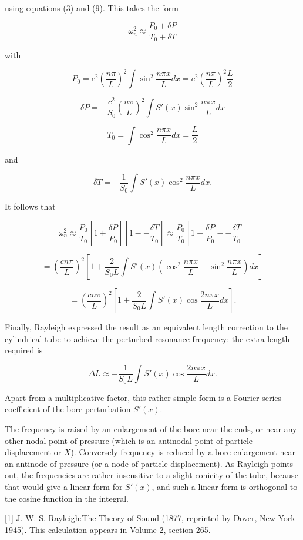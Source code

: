   using equations (3) and (9). This takes the form 

  $$\omega_n^2 \approx \dfrac{P_0 + \delta P}{T_0 + \delta T} \tag{13}$$ 

  with 

  $$P_0=c^2 \left(\dfrac{n \pi}{L}\right)^2 \int{ \sin^2 \dfrac{n \pi x}{L} 
  dx}=c^2 \left(\dfrac{n \pi}{L}\right)^2 \dfrac{L}{2} \tag{14}$$ 

  $$\delta P=-\dfrac{c^2}{S_0} \left(\dfrac{n \pi}{L}\right)^2 \int{S'(x) 
  \sin^2 \dfrac{n \pi x}{L} dx} \tag{15}$$ 

  $$T_0=\int{ \cos^2 \dfrac{n \pi x}{L} dx} =\dfrac{L}{2} \tag{16}$$ 

  and 

  $$\delta T=-\dfrac{1}{S_0} \int{S'(x) \cos^2 \dfrac{n \pi x}{L} dx} . 
  \tag{17}$$ 

  It follows that 

  $$\omega_n^2 \approx \dfrac{P_0}{T_0}\left[1 + \dfrac{\delta P}{P_0}\right] 
  \left[1 -- \dfrac{\delta T}{T_0}\right]\approx \dfrac{P_0}{T_0}\left[1 + 
  \dfrac{\delta P}{P_0} -- \dfrac{\delta T}{T_0}\right]$$ 

  $$=\left(\dfrac{c n \pi}{L}\right)^2 \left[1+\dfrac{2}{S_0L} \int{S'(x) 
  \left(\cos^2\dfrac{n \pi x}{L}-\sin^2 \dfrac{n \pi x}{L} \right) dx}\right]$$ 

  $$=\left(\dfrac{c n \pi}{L}\right)^2 \left[1+\dfrac{2}{S_0L} \int{S'(x) 
  \cos\dfrac{2n \pi x}{L} dx}\right] . \tag{18}$$ 

  Finally, Rayleigh expressed the result as an equivalent length correction to 
  the cylindrical tube to achieve the perturbed resonance frequency: the extra 
  length required is 

  $$\Delta L \approx -\dfrac{1}{S_0L} \int{S'(x) \cos\dfrac{2n \pi x}{L} dx} . 
  \tag{19}$$ 

  Apart from a multiplicative factor, this rather simple form is a Fourier 
  series coefficient of the bore perturbation $S'(x)$. 

  The frequency is raised by an enlargement of the bore near the ends, or near 
  any other nodal point of pressure (which is an antinodal point of particle 
  displacement or $X$). Conversely frequency is reduced by a bore enlargement 
  near an antinode of pressure (or a node of particle displacement). As 
  Rayleigh points out, the frequencies are rather insensitive to a slight 
  conicity of the tube, because that would give a linear form for $S'(x)$, and 
  such a linear form is orthogonal to the cosine function in the integral. 

  \sectionreferences{}[1] J. W. S. Rayleigh:The Theory of Sound (1877, 
  reprinted by Dover, New York 1945). This calculation appears in Volume 2, 
  section 265. 